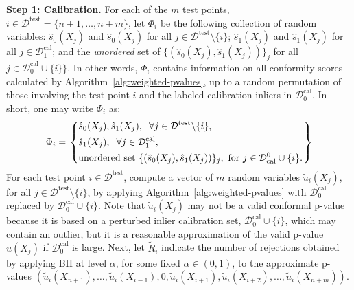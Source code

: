 \documentclass[11pt]{article}
\begin{document}
\textbf{Step 1: Calibration.} For each of the $m$ test points, $i \in \mathcal{D}^{\mathrm{test}} = \{n+1,\ldots,n+m\}$, let $\Phi_i$ be the following collection of random variables: $\hat{s}_0(X_j)$ and $\hat{s}_0(X_j)$ for all $j \in \mathcal{D}^{\mathrm{test}} \setminus \{i\}$; $\hat{s}_1(X_j)$ and $\hat{s}_1(X_j)$ for all $j \in \mathcal{D}_1^{\mathrm{cal}}$; and the {\em unordered} set of $\{(\hat{s}_0(X_j), \hat{s}_1(X_j))\}_j$ for all $j \in \mathcal{D}_0^{\mathrm{cal}} \cup \{i\}\}$.
In other words, $\Phi_i$ contains information on all conformity scores calculated by Algorithm~\ref{alg:weighted-pvalues}, up to a random permutation of those involving the test point $i$ and the labeled calibration inliers in $\mathcal{D}_0^{\mathrm{cal}}$. In short, one may write $\Phi_i$ as:
\begin{align}\label{eq:sigma_algebra}
    \Phi_i=
  \begin{rcases}
    \begin{dcases}
      \hat{s}_0(X_j), \hat{s}_1(X_j), \hspace{0.2cm}  \forall j \in \mathcal{D}^{\mathrm{test}} \backslash \{i\}, \\
      \hat{s}_1(X_j), \hspace{0.2cm}  \forall j \in \mathcal{D}^{\mathrm{cal}}_1, \\
      \text{unordered set } \{(\hat{s}_0(X_j), \hat{s}_1(X_j))\}_j, \text{ for } j \in \mathcal{D}^0_{\mathrm{cal}} \cup \{i\}.
    \end{dcases}
  \end{rcases}
\end{align}
For each test point $i \in \mathcal{D}^{\mathrm{test}}$, compute a vector of $m$ random variables $\tilde{u}_{i}(X_j)$, for all $j \in \mathcal{D}^{\mathrm{test}} \setminus \{i\}$, by applying Algorithm~\ref{alg:weighted-pvalues} with $\mathcal{D}^{\mathrm{cal}}_0$ replaced by $\mathcal{D}^{\mathrm{cal}}_0 \cup \{i\}$.
Note that  $\tilde{u}_{i}(X_j)$ may not be a valid conformal p-value because it is based on a perturbed inlier calibration set, $\mathcal{D}^{\mathrm{cal}}_0 \cup \{i\}$, which may contain an outlier, but it is a reasonable approximation of the valid p-value $\hat{u}(X_j)$ if $\mathcal{D}^{\mathrm{cal}}_0$ is large.
Next, let $\tilde{R}_i$ indicate the number of rejections obtained by applying BH at level $\alpha$, for some fixed $\alpha \in (0,1)$, to the approximate p-values $(\tilde{u}_i(X_{n+1}), \dots, \tilde{u}_i(X_{i-1}), 0, \tilde{u}_i(X_{i+1}), \tilde{u}_i(X_{i+2}), \dots, \tilde{u}_i(X_{n+m}))$.
\end{document}
